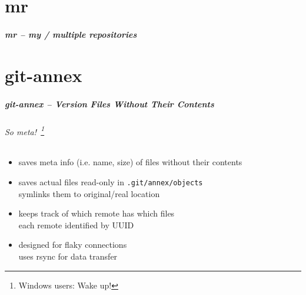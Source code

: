 \documentclass[english,hyperref={pdfpagelabels=false},aspectratio=169]{beamer}
\begin{document}
\part{mr}
\makepart

\begin{frame}[label=mr]
  \frametitle{mr -- my / multiple repositories}
  \framesubtitle{}
  
\end{frame}


\part{git-annex}
\makepart

\begin{frame}[label=gitannex]
  \frametitle{git-annex -- Version Files Without Their Contents}
  \framesubtitle{So meta!~\footnote{\tiny Windows users: Wake up!}}
  \begin{itemize}
    \item saves meta info {\scriptsize\color{fzjgray50}(i.e. name, size)} of files without their contents
    \item saves actual files read-only in \texttt{.git/annex/objects}\\
      {\scriptsize symlinks them to original/real location}
    \item keeps track of which remote has which files\\
      {\scriptsize each remote identified by UUID}
    \item designed for flaky connections\\
      {\scriptsize uses rsync for data transfer}
  \end{itemize}
\end{frame}
\end{document}
